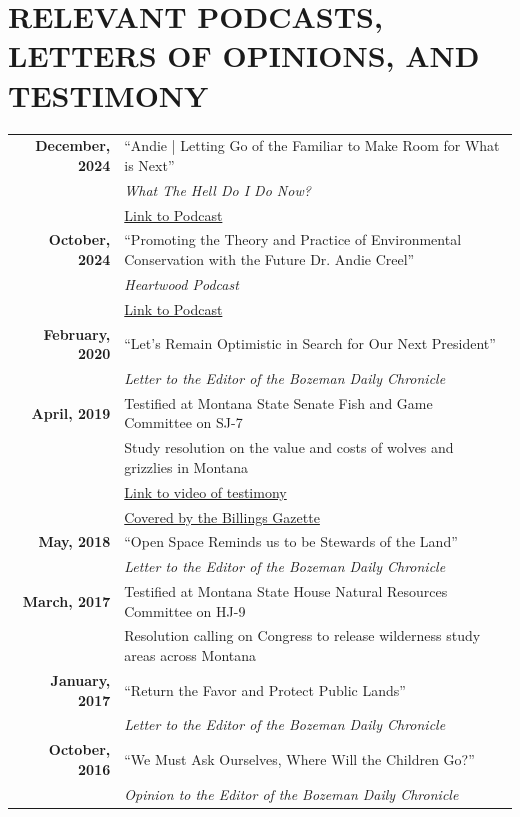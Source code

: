 \documentclass[11pt]{article}
\begin{document}
\section*{RELEVANT PODCASTS, LETTERS OF OPINIONS, AND TESTIMONY}
\begin{longtable}{>{\bfseries}r p{5.5in}}%
December, 2024 & “Andie | Letting Go of the Familiar to Make Room for What is Next” \\
    & \textit{What The Hell Do I Do Now?}\\
    & \href{https://open.spotify.com/episode/7bswDIxoYApUMYuF7UPw6C?si=b8d9c4fdcc804742}{Link to Podcast} \\[1ex]
October, 2024 & “Promoting the Theory and Practice of Environmental Conservation with the Future Dr. Andie Creel” \\
    & \textit{Heartwood Podcast} \\
    & \href{https://podcasts.apple.com/us/podcast/heartwood/id1474971310?i=1000673543724}{Link to Podcast} \\[1ex]
February, 2020 & “Let’s Remain Optimistic in Search for Our Next President” \\
    & \textit{Letter to the Editor of the Bozeman Daily Chronicle} \\[1ex]
April, 2019 & Testified at Montana State Senate Fish and Game Committee on SJ-7 \\
    & Study resolution on the value and costs of wolves and grizzlies in Montana \\
    & \href{https://www.facebook.com/watch/?v=2242142425832448}{Link to video of testimony} \\
    & \href{https://billingsgazette.com/outdoors/montana-could-study-of-economic-costs-benefits-of-wolves-grizzlies/article_4cba1d42-20a7-535b-a06c-49b800b1fe67.html?fbclid=IwAR2AH4iV9oVMiqb84HeFRVAxnHxhk-furTRHPYwgPYg9yOZv9gZg9rW6eJ4}{Covered by the Billings Gazette} \\[1ex]
May, 2018 & “Open Space Reminds us to be Stewards of the Land” \\
    & \textit{Letter to the Editor of the Bozeman Daily Chronicle}\\[1ex]
March, 2017 & Testified at Montana State House Natural Resources Committee on HJ-9 \\
    & Resolution calling on Congress to release wilderness study areas across Montana \\
January, 2017 & “Return the Favor and Protect Public Lands” \\
    & \textit{Letter to the Editor of the Bozeman Daily Chronicle} \\[1ex]
October, 2016 & “We Must Ask Ourselves, Where Will the Children Go?” \\
    & \textit{Opinion to the Editor of the Bozeman Daily Chronicle} \\
\end{longtable}
\end{document}
